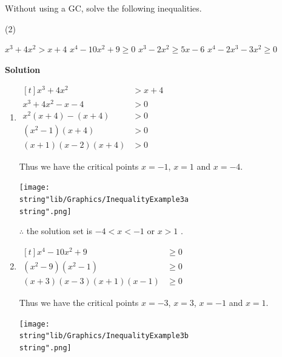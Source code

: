 \documentclass[11pt,a4paper]{book}
\begin{document}
\begin{example}{}

Without using a GC, solve the following inequalities.

\begin{tasks}[label=(\alph*),label-width=3.5ex](2)

\task $x^{3}+4x^{2}>x+4$
\task $x^{4}-10x^{2}+9\geq0$
\task $x^{3}-2x^{2}\geq5x-6$
\task $x^{4}-2x^{3}-3x^{2}\geq0$

\end{tasks}

\textbf{Solution}

\begin{enumerate}[label=(\alph*)]

\item
$
\begin{aligned}[t]
x^{3}+4x^{2} & >x+4\\
x^{3}+4x^{2}-x-4 & >0\\
x^{2}\left(x+4\right)-\left(x+4\right) & >0\\
\left(x^{2}-1\right)\left(x+4\right) & >0\\
\left(x+1\right)\left(x-2\right)\left(x+4\right) & >0
\end{aligned}
$

Thus we have the critical points $x=-1$, $x=1$ and $x=-4$.
\begin{center}
\texttt{[image: \\string"lib/Graphics/InequalityExample3a\\string".png]}
\par\end{center}

$\therefore$ the solution set is $-4<x<-1$ or $x>1$ .

\item
$
\begin{aligned}[t]
x^{4}-10x^{2}+9 & \geq0\\
\left(x^{2}-9\right)\left(x^{2}-1\right) & \geq0\\
\left(x+3\right)\left(x-3\right)\left(x+1\right)\left(x-1\right) & \geq0
\end{aligned}
$

Thus we have the critical points $x=-3$, $x=3$, $x=-1$ and $x=1$.
\begin{center}
\texttt{[image: \\string"lib/Graphics/InequalityExample3b\\string".png]}
\par\end{center}


\end{enumerate}
\end{example}
\end{document}
